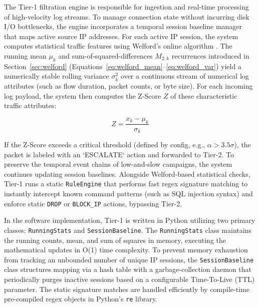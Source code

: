 The Tier-1 filtration engine is responsible for ingestion and real-time processing of high-velocity log streams. To manage connection state without incurring disk I/O bottlenecks, the engine incorporates a temporal session baseline manager that maps active source IP addresses. For each active IP session, the system computes statistical traffic features using Welford's online algorithm \cite{welford1962}. The running mean $\mu_k$ and sum-of-squared-differences $M_{2,k}$ recurrences introduced in Section~\ref{sec:welford} (Equations~\ref{eq:welford_mean}--\ref{eq:welford_var}) yield a numerically stable rolling variance $\sigma_k^2$ over a continuous stream of numerical log attributes (such as flow duration, packet counts, or byte size). For each incoming log payload, the system then computes the Z-Score $Z$ of these characteristic traffic attributes:

\begin{equation}
    Z = \frac{x_k - \mu_k}{\sigma_k}
\end{equation}

If the Z-Score exceeds a critical threshold (defined by config, e.g., $\alpha > 3.5\sigma$), the packet is labeled with an `ESCALATE` action and forwarded to Tier-2. To preserve the temporal event chains of low-and-slow campaigns, the system continues updating session baselines. Alongside Welford-based statistical checks, Tier-1 runs a static \texttt{RuleEngine} that performs fast regex signature matching to instantly intercept known command patterns (such as SQL injection syntax) and enforce static \texttt{DROP} or \texttt{BLOCK\_IP} actions, bypassing Tier-2.

In the software implementation, Tier-1 is written in Python utilizing two primary classes: \texttt{RunningStats} and \texttt{SessionBaseline}. The \texttt{RunningStats} class maintains the running counts, mean, and sum of squares in memory, executing the mathematical updates in O(1) time complexity. To prevent memory exhaustion from tracking an unbounded number of unique IP sessions, the \texttt{SessionBaseline} class structures mapping via a hash table with a garbage-collection daemon that periodically purges inactive sessions based on a configurable Time-To-Live (TTL) parameter. The static signature matches are handled efficiently by compile-time pre-compiled regex objects in Python's \texttt{re} library.


